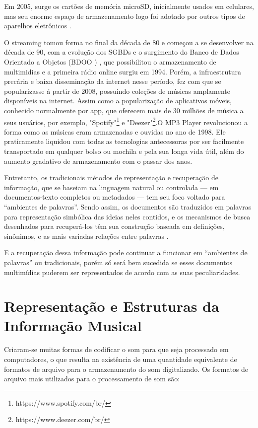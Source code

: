 Em 2005, surge os cartões de memória microSD, inicialmente usados em celulares, mas seu enorme espaço de armazenamento logo foi adotado por outros tipos de aparelhos eletrônicos \cite{marchi2005}.

O streaming tomou forma no final da década de 80 e começou a se desenvolver na década de 90, com a evolução dos SGBDs  e o surgimento do Banco de Dados Orientado a Objetos (BDOO ) \cite{junior&segundo2008}, que possibilitou o armazenamento de multimidias e a primeira rádio online surgiu em 1994. Porém, a infraestrutura precária e baixa disseminação da internet nesse período, fez com que se popularizasse á partir de 2008, possuindo coleções de músicas amplamente disponíveis na internet. Assim como a popularização de aplicativos móveis, conhecido normalmente por app, que oferecem mais de 30 milhões de música a seus usuários, por exemplo, "Spotify"\footnote{https://www.spotify.com/br/} e "Deezer"\footnote{https://www.deezer.com/br/}.O MP3 Player revolucionou a forma como as músicas eram armazenadas e ouvidas no ano de 1998. Ele praticamente liquidou com todas as tecnologias antecessoras por ser facilmente transportado em qualquer bolso ou mochila e pela sua longa vida útil, além do aumento gradativo de armazenamento com o passar dos anos.

Entretanto, os tradicionais métodos de representação e recuperação de informação, que se baseiam na linguagem natural ou controlada — em documentos-texto completos ou metadados — tem seu foco voltado para “ambientes de palavras”. Sendo assim, os documentos são traduzidos em palavras para representação simbólica das ideias neles contidos, e os mecanismos de busca desenhados para recuperá-los têm sua construção baseada em definições, sinônimos, e as mais variadas relações entre palavras \cite{lima&santini2006}.

E a recuperação dessa informação pode continuar a funcionar em “ambientes de palavras” ou tradicionais, porém só será bem sucedida se esses documentos multimídias puderem ser representados de acordo com as suas peculiaridades.

\section{Representação e Estruturas da Informação Musical}

Criaram-se muitas formas de codificar o som para que seja processado em computadores, o que resulta na existência de uma quantidade equivalente de formatos de arquivo para o armazenamento do som digitalizado. Os formatos de arquivo mais utilizados para o processamento de som são:

